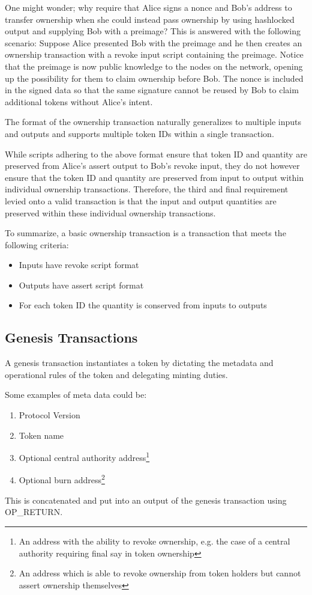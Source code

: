 \documentclass[9pt,oneside]{amsart}
\begin{document}
\begin{multicols}{2}
One might wonder; why require that Alice signs a nonce and Bob's address to transfer ownership when she could instead pass ownership by using hashlocked output and supplying Bob with a preimage? This is answered with the following scenario: Suppose Alice presented Bob with the preimage and he then creates an ownership transaction with a revoke input script containing the preimage. Notice that the preimage is now public knowledge to the nodes on the network, opening up the possibility for them to claim ownership before Bob. The nonce is included in the signed data so that the same signature cannot be reused by Bob to claim additional tokens without Alice's intent.

The format of the ownership transaction naturally generalizes to multiple inputs and outputs and supports multiple token IDs within a single transaction.

While scripts adhering to the above format ensure that token ID and quantity are preserved from Alice's assert output to Bob's revoke input, they do not however ensure that the token ID and quantity are preserved from input to output within individual ownership transactions. Therefore, the third and final requirement levied onto a valid transaction is that the input and output quantities are preserved within these individual ownership transactions.

To summarize, a basic ownership transaction is a transaction that meets the following criteria:
\begin{itemize}
    \item Inputs have revoke script format
    \item Outputs have assert script format
    \item For each token ID the quantity is conserved from inputs to outputs
\end{itemize}

\subsection{Genesis Transactions}\label{subsec:gentrans}
A genesis transaction instantiates a token by dictating the metadata and operational rules of the token and delegating minting duties.

Some examples of meta data could be:
\begin{enumerate}
	\item Protocol Version
    \item Token name
	\item Optional central authority address\footnote{An address with the ability to revoke ownership, e.g. the case of a central authority requiring final say in token ownership}
    \item Optional burn address\footnote{An address which is able to revoke ownership from token holders but cannot assert ownership themselves}
\end{enumerate}
This is concatenated and put into an output of the genesis transaction using OP\_RETURN.


\end{multicols}
\end{document}

